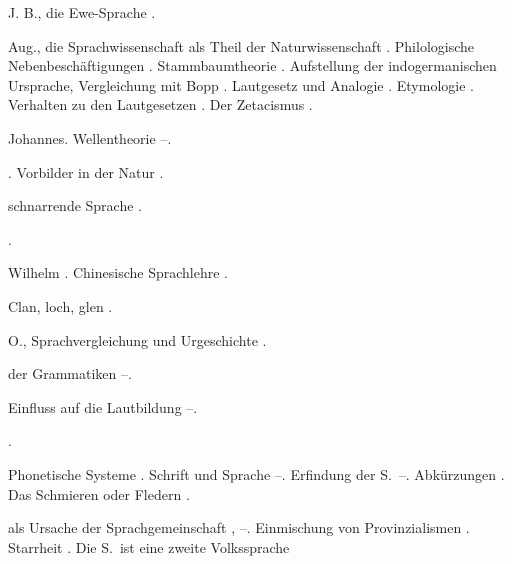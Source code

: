 \begin{register}
 J. B., die Ewe-Sprache \pageref{sp.52}.

 Aug., die Sprachwissenschaft als Theil der Naturwissenschaft \pageref{sp.15}. Philologische Nebenbeschäftigungen \pageref{sp.136}. Stammbaumtheorie \pageref{sp.163}. Aufstellung der indogermanischen Ursprache, Vergleichung mit Bopp \sed{\pageref{sp.164},} \pageref{sp.172}. Lautgesetz und Analogie \pageref{sp.173}. Etymologie \pageref{sp.180}. Verhalten zu den Lautgesetzen \pageref{sp.185}\sed{, \pageref{sp.197}}. Der Zetacismus \pageref{sp.201}.


 Johannes. Wellentheorie \pageref{sp.164}–\pageref{sp.165}\sed{, \pageref{sp.192}}. 

 \pageref{sp.34}.  Vorbilder in der Natur \pageref{sp.314}.

 schnarrende Sprache \pageref{sp.184}.

 \pageref{sp.282}.

 Wilhelm \pageref{sp.31}. Chinesische Sprachlehre \pageref{sp.113}.

 Clan, loch, glen \pageref{sp.265}.

 O., Sprachvergleichung und Urgeschichte \pageref{sp.294}.


 der Grammatiken \pageref{sp.107}–\pageref{sp.109}.

 Einfluss auf die Lautbildung \pageref{sp.444}–\pageref{sp.445}.

 \pageref{sp.234}.

 Phonetische Systeme \pageref{sp.38}. Schrift und Sprache \pageref{sp.127}–\pageref{sp.135}. Erfindung der S.~\pageref{sp.127}–\pageref{sp.129}. Abkürzungen \pageref{sp.433}. Das Schmieren oder Fledern \pageref{sp.433}.


 als Ursache der Sprachgemeinschaft \pageref{sp.55}, \pageref{sp.57}–\pageref{sp.58}. Einmischung von Provinzialismen \pageref{sp.62}. Starrheit \pageref{sp.132}. Die S.~ist eine zweite Volkssprache \pageref{sp.133}


\end{register}
